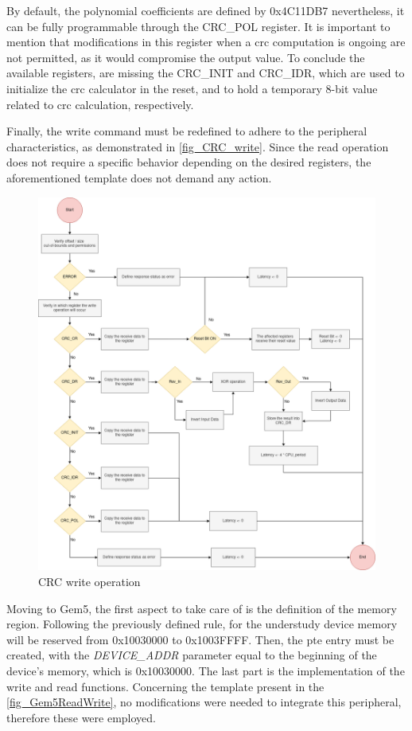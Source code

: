 By default, the polynomial coefficients are defined by 0x4C11DB7 nevertheless, it can be fully programmable through the CRC\_POL register.
It is important to mention that modifications in this register when a \gls{crc} computation is ongoing are not permitted, as it would 
compromise the output value. To conclude the available registers, are missing the CRC\_INIT and CRC\_IDR, which are used to initialize 
the \gls{crc} calculator in the reset, and to hold a temporary 8-bit value related to \gls{crc} calculation, respectively. 

Finally, the write command must be redefined to adhere to the peripheral characteristics, as demonstrated in \autoref{fig_CRC_write}.
Since the read operation does not require a specific behavior depending on the desired registers, the aforementioned template does not demand any
action.   

\begin{figure}[ht!]
	\centering
 	\includegraphics[width=0.7\linewidth]{Images/CRC_write.png}
 	\caption{CRC write operation}
	 \label{fig_CRC_write}
\end{figure}


Moving to Gem5, the first aspect to take care of is the definition of the memory region. Following the previously defined rule, for the understudy device 
memory will be reserved from 0x10030000 to 0x1003FFFF. Then, the \gls{pte} entry must be created, with the \textit{DEVICE\_ADDR} parameter equal to 
the beginning of the device's memory, which is 0x10030000. The last part is the implementation of the write and read functions. Concerning the 
template present in the \autoref{fig_Gem5ReadWrite}, no modifications were needed to integrate this peripheral, therefore these were employed. 

